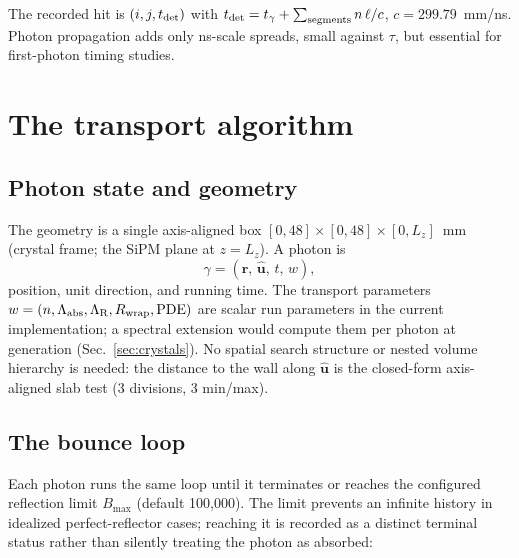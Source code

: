 \documentclass[11pt,a4paper]{article}
\begin{document}
The recorded hit is $(i, j, t_{\rm det})$ with
$t_{\rm det} = t_\gamma + \sum_{\rm segments} n\,\ell/c$, $c = 299.79$~mm/ns. Photon
propagation adds only ns-scale spreads, small against $\tau$, but essential for first-photon
timing studies.

\section{The transport algorithm}
\label{sec:algorithm}

\subsection{Photon state and geometry}

The geometry is a single axis-aligned box $[0,48]\times[0,48]\times[0,L_z]$~mm (crystal frame;
the SiPM plane at $z = L_z$). A photon is
\begin{equation}
  \gamma = (\mathbf{r},\, \hat{\mathbf{u}},\, t,\, w),
\end{equation}
position, unit direction, and running time. The transport parameters
$w = (n, \Lambda_{\rm abs}, \Lambda_{\rm R}, R_{\rm wrap}, \mathrm{PDE})$ are scalar
run parameters in the current implementation; a spectral extension would compute them
per photon at generation (Sec.~\ref{sec:crystals}). No spatial search structure or nested
volume hierarchy is needed: the distance to
the wall along $\hat{\mathbf{u}}$ is the closed-form axis-aligned slab test (3 divisions,
3 min/max).

\subsection{The bounce loop}

Each photon runs the same loop until it terminates or reaches the configured reflection
limit $B_{\max}$ (default 100,000). The limit prevents an infinite history in idealized
perfect-reflector cases; reaching it is recorded as a distinct terminal status rather
than silently treating the photon as absorbed:
\end{document}
